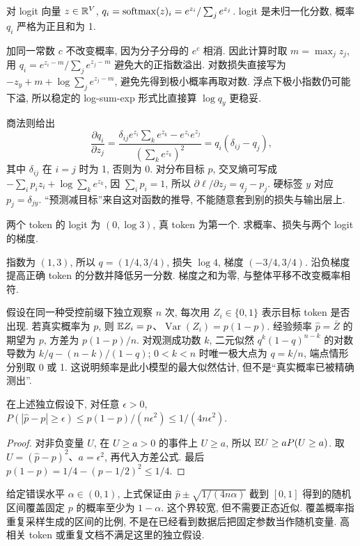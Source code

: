 \begin{definition}
对 logit 向量 $z\in\mathbb R^V$, $q_i=\operatorname{softmax}(z)_i=e^{z_i}/\sum_je^{z_j}$. logit 是未归一化分数, 概率 $q_i$ 严格为正且和为 1.
\end{definition}
加同一常数 $c$ 不改变概率, 因为分子分母的 $e^c$ 相消. 因此计算时取 $m=\max_jz_j$, 用 $q_i=e^{z_i-m}/\sum_je^{z_j-m}$ 避免大的正指数溢出. 对数损失直接写为
$-z_y+m+\log\sum_je^{z_j-m}$, 避免先得到极小概率再取对数. 浮点下极小指数仍可能下溢, 所以稳定的 log-sum-exp 形式比直接算 $\log q_y$ 更稳妥.

商法则给出
\[
\frac{\partial q_i}{\partial z_j}
=\frac{\delta_{ij}e^{z_i}\sum_ke^{z_k}-e^{z_i}e^{z_j}}
{(\sum_ke^{z_k})^2}=q_i(\delta_{ij}-q_j),
\]
其中 $\delta_{ij}$ 在 $i=j$ 时为 1, 否则为 0. 对分布目标 $p$, 交叉熵可写成 $-\sum_ip_iz_i+\log\sum_ke^{z_k}$, 因 $\sum_ip_i=1$, 所以 $\partial\ell/\partial z_j=q_j-p_j$. 硬标签 $y$ 对应 $p_j=\delta_{jy}$. “预测减目标”来自这对函数的推导, 不能随意套到别的损失与输出层上.

\begin{example}
两个 token 的 logit 为 $(0,\log3)$, 真 token 为第一个. 求概率、损失与两个 logit 的梯度.
\end{example}
\begin{solution}
指数为 $(1,3)$, 所以 $q=(1/4,3/4)$, 损失 $\log4$, 梯度 $(-3/4,3/4)$. 沿负梯度提高正确 token 的分数并降低另一分数. 梯度之和为零, 与整体平移不改变概率相符.
\end{solution}

假设在同一种受控前缀下独立观察 $n$ 次, 每次用 $Z_i\in\{0,1\}$ 表示目标 token 是否出现. 若真实概率为 $p$, 则 $\mathbb E Z_i=p$、$\operatorname{Var}(Z_i)=p(1-p)$. 经验频率 $\hat p=\bar Z$ 的期望为 $p$, 方差为 $p(1-p)/n$. 对观测成功数 $k$, 二元似然 $q^k(1-q)^{n-k}$ 的对数导数为 $k/q-(n-k)/(1-q)$; $0<k<n$ 时唯一极大点为 $q=k/n$, 端点情形分别取 0 或 1. 这说明频率是此小模型的最大似然估计, 但不是“真实概率已被精确测出”.

\begin{proposition}
在上述独立假设下, 对任意 $\epsilon>0$,
$P(|\hat p-p|\ge\epsilon)\le p(1-p)/(n\epsilon^2)\le1/(4n\epsilon^2)$.
\end{proposition}
\begin{proof}
对非负变量 $U$, 在 $U\ge a>0$ 的事件上 $U\ge a$, 所以 $\mathbb E U\ge aP(U\ge a)$. 取 $U=(\hat p-p)^2$、$a=\epsilon^2$, 再代入方差公式. 最后 $p(1-p)=1/4-(p-1/2)^2\le1/4$.
\end{proof}
给定错误水平 $\alpha\in(0,1)$, 上式保证由 $\hat p\pm\sqrt{1/(4n\alpha)}$ 截到 $[0,1]$ 得到的随机区间覆盖固定 $p$ 的概率至少为 $1-\alpha$. 这个界较宽, 但不需要正态近似. 覆盖概率指重复采样生成的区间的比例, 不是在已经看到数据后把固定参数当作随机变量. 高相关 token 或重复文档不满足这里的独立假设.


